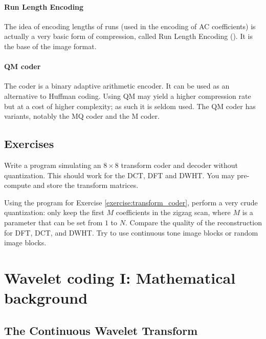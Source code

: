 \documentclass[a4paper, 11pt, openany]{book}
\begin{document}
\paragraph{Run Length Encoding} The idea of encoding lengths of runs (used in the encoding of AC coefficients) is actually a very basic form of compression, called Run Length Encoding (). It is the base of the  image format.

\paragraph{QM coder} The  coder is a binary adaptive arithmetic encoder. It can be used as an alternative to Huffman coding. Using QM may yield a higher compression rate but at a cost of higher complexity; as such it is seldom used. The QM coder has variants, notably the MQ coder and the M coder.



\subsection{Exercises}

\begin{exercise} \label{exercise:transform_coder}
Write a program simulating an $8 \times 8$ transform coder and decoder without quantization. This should work for the DCT, DFT and DWHT. You may pre-compute and store the transform matrices.
\end{exercise}

\begin{exercise}
Using the program for Exercise \ref{exercise:transform_coder}, perform a very crude quantization: only keep the first $M$ coefficients in the zigzag scan,  where $M$ is a parameter that can be set from $1$ to $N$. Compare the quality of the reconstruction for DFT, DCT, and DWHT. Try to use continuous tone image blocks or random image blocks.
\end{exercise}




\section{Wavelet coding I: Mathematical background}
\label{sec:08}


\subsection{The Continuous Wavelet Transform}
\end{document}

